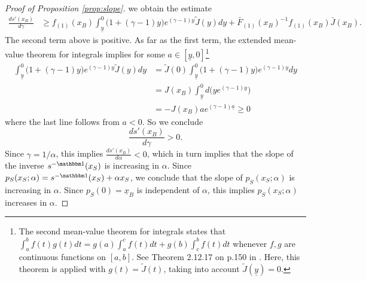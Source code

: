 \documentclass[11pt,twopage]{article}
\newcommand{\ul}{\underline}
\begin{document}
\begin{proof}[Proof of Proposition \ref{prop:slope}]
we obtain the estimate
\begin{align*}
\frac{ds'(x_B)}{d \gamma} &\geq  f_{(1)}(x_B)\int_{\ul y}^{0} \Big(1+(\gamma - 1)y \Big)e^{(\gamma - 1) y}
\tilde J(y) dy+\bar F_{(1)}(x_B)^{-1} f_{(1)}(x_B) \bar J(x_B).
\end{align*}
The second term above is positive. As far as the first term, the extended mean-value theorem for integrals implies for some $a \in [\ul y,0]$\footnote{The second mean-value theorem for integrals states that $\int_a^b f(t)g(t)dt = g(a) \int_a^c f(t)dt+ g(b) \int_c^b f(t)dt$ whenever $f,g$ are continuous functions on $[a,b]$. See Theorem 2.12.17 on p.150 in \cite{bogachev2007measure}. Here, this theorem is applied with $g(t) = \tilde J(t)$, taking into account $\tilde J(\ul y) = 0$.}
\begin{align*}
\int_{\ul y}^{0} \Big(1+(\gamma - 1)y \Big)e^{(\gamma - 1) y}
\tilde J(y) dy &= \tilde J(0) \int_{\ul y}^{0} \Big(1+(\gamma - 1)y \Big)e^{(\gamma - 1) y} dy
\\&=J(x_B)  \int_{\ul y}^{0} d\Big(ye^{(\gamma - 1) y}\Big)
\\&=-J(x_B) a e^{(\gamma - 1) \ul a}\geq 0
\end{align*}
where the last line follows from $a<0$. So we conclude \[ \frac{ds'(x_B)}{d \gamma}> 0.\] Since $\gamma = 1/\alpha$, this implies $\frac{ds'(x_B)}{d \alpha}<0$, which in turn implies that the slope of the inverse $s^{-\mathbbm 1}(x_S)$ is increasing in $\alpha$. Since $p_S(x_S;\alpha) = s^{-\mathbbm 1}(x_S)+\alpha x_S$, we conclude that the slope of $p_S(x_S;\alpha)$ is increasing in $\alpha$. Since $p_S(0) =  \ul x_B$ is independent of $\alpha$, this implies $p_S(x_S;\alpha)$ increases in $\alpha$.

\end{proof}
\end{document}
